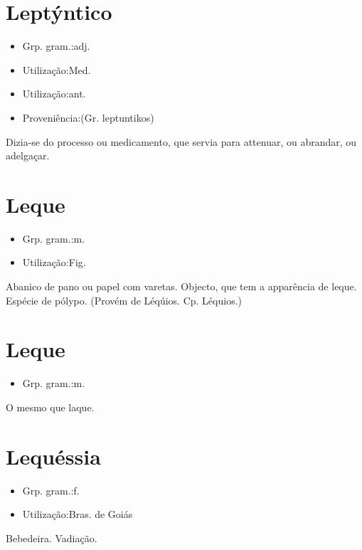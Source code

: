 \section{Leptýntico}
\begin{itemize}
\item {Grp. gram.:adj.}
\end{itemize}
\begin{itemize}
\item {Utilização:Med.}
\end{itemize}
\begin{itemize}
\item {Utilização:ant.}
\end{itemize}
\begin{itemize}
\item {Proveniência:(Gr. \textunderscore leptuntikos\textunderscore )}
\end{itemize}
Dizia-se do processo ou medicamento, que servia para attenuar, ou abrandar, ou adelgaçar.
\section{Leque}
\begin{itemize}
\item {Grp. gram.:m.}
\end{itemize}
\begin{itemize}
\item {Utilização:Fig.}
\end{itemize}
Abanico de pano ou papel com varetas.
Objecto, que tem a apparência de leque.
Espécie de pólypo.
(Provém de \textunderscore Léqúios\textunderscore . Cp. \textunderscore Léquios\textunderscore .)
\section{Leque}
\begin{itemize}
\item {Grp. gram.:m.}
\end{itemize}
O mesmo que \textunderscore laque\textunderscore .
\section{Lequéssia}
\begin{itemize}
\item {Grp. gram.:f.}
\end{itemize}
\begin{itemize}
\item {Utilização:Bras. de Goiás}
\end{itemize}
Bebedeira.
Vadiação.
